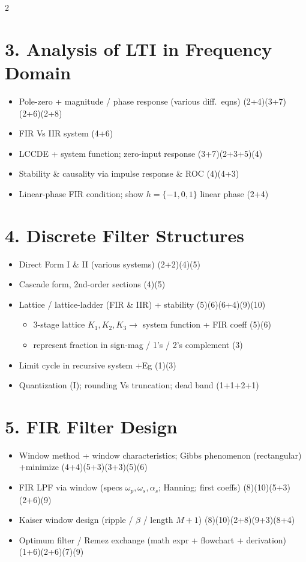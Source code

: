 \documentclass[10pt]{article}
\begin{document}
\begin{multicols}{2}
\section*{3. Analysis of LTI in Frequency Domain}
\begin{itemize}
  \item Pole-zero + magnitude / phase response (various diff.\ eqns) \hfill (2+4)(3+7)(2+6)(2+8)
  \item FIR Vs IIR system \hfill (4+6)
  \item LCCDE + system function; zero-input response \hfill (3+7)(2+3+5)(4)
  \item Stability \& causality via impulse response \& ROC \hfill (4)(4+3)
  \item Linear-phase FIR condition; show $h=\{-1,0,1\}$ linear phase \hfill (2+4)
\end{itemize}

\section*{4. Discrete Filter Structures}
\begin{itemize}
  \item Direct Form I \& II (various systems) \hfill (2+2)(4)(5)
  \item Cascade form, 2nd-order sections \hfill (4)(5)
  \item Lattice / lattice-ladder (FIR \& IIR) + stability \hfill (5)(6)(6+4)(9)(10)
    \begin{itemize}
      \item 3-stage lattice $K_1,K_2,K_3\to$ system function + FIR coeff \hfill (5)(6)
      \item represent fraction in sign-mag / 1's / 2's complement \hfill (3)
    \end{itemize}
  \item Limit cycle in recursive system +Eg \hfill (1)(3)
  \item Quantization (I); rounding Vs truncation; dead band \hfill (1+1+2+1)
\end{itemize}

\section*{5. FIR Filter Design}
\begin{itemize}
  \item Window method + window characteristics; Gibbs phenomenon (rectangular) +minimize \hfill (4+4)(5+3)(3+3)(5)(6)
  \item FIR LPF via window (specs $\omega_p,\omega_s,\alpha_s$; Hanning; first coeffs) \hfill (8)(10)(5+3)(2+6)(9)
  \item Kaiser window design (ripple / $\beta$ / length $M{+}1$) \hfill (8)(10)(2+8)(9+3)(8+4)
  \item Optimum filter / Remez exchange (math expr + flowchart + derivation) \hfill (1+6)(2+6)(7)(9)
\end{itemize}


\end{multicols}
\end{document}
